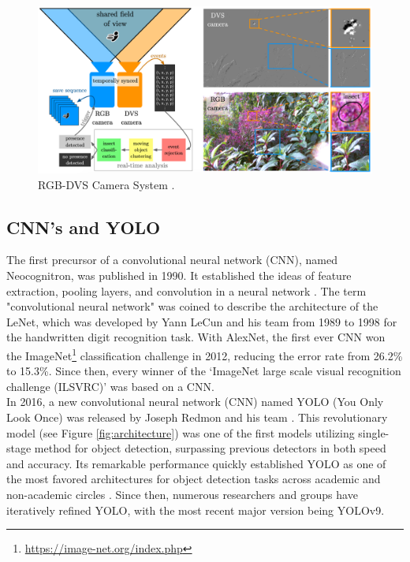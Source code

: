\documentclass[sigchi,screen]{acmart}
\begin{document}
\begin{figure}[htbp] %
    \centering %
    \includegraphics[width=\linewidth]{figures/dvs-system.png} %
    \caption{RGB-DVS Camera System \cite{Gebauer_2024_WACV}.} %
    \label{fig:dvs-system} %
\end{figure}

\subsection{CNN's and YOLO}

The first precursor of a convolutional neural network (CNN), named Neocognitron, was published in 1990. It established the ideas of feature extraction, pooling layers, and convolution in a neural network \cite{fukushima1980neocognitron}. The term "convolutional neural network" was coined to describe the architecture of the LeNet\cite{lecun1998gradient}, which was developed by Yann LeCun and his team from 1989 to 1998 for the handwritten digit recognition task. With AlexNet\cite{krizhevsky2012imagenet}, the first ever CNN won the ImageNet\footnote{\url{https://image-net.org/index.php}} classification challenge in 2012, reducing the error rate from  26.2\% to 15.3\%. Since then, every winner of the ‘ImageNet large scale visual recognition challenge (ILSVRC)’ was based on a CNN.\\
In 2016, a new convolutional neural network (CNN) named YOLO (You Only Look Once) was released by Joseph Redmon and his team \cite{Redmon_2016_CVPR}. This revolutionary model (see Figure \ref{fig:architecture}) was one of the first models utilizing single-stage method for object detection, surpassing previous detectors in both speed and accuracy. Its remarkable performance quickly established YOLO as one of the most favored architectures for object detection tasks across academic and non-academic circles \cite{scharf2023TEMP}. Since then, numerous researchers and groups have iteratively refined YOLO, with the most recent major version being YOLOv9\cite{wang2024yolov9}.
\end{document}
